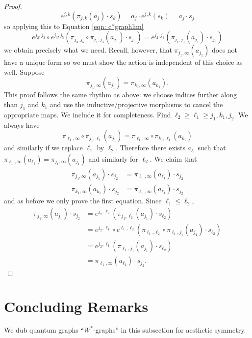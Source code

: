 \documentclass[12pt]{article}
\theoremstyle{definition}
\newcommand{\<}{\langle}
\renewcommand{\>}{\rangle}
\begin{document}
\begin{proof}
    \[
    e^{j,k} (\pi_{j,k}(a_j) \cdot s_k) = a_j \cdot e^{j,k}(s_k) = a_j \cdot s_j
    \]
    so applying this to Equation \ref{eqn: c*graphlim}
    \[
    e^{j_2,j_3} \circ e^{j_3, j_5} (\pi_{j_3, j_5} \circ \pi_{j_1, j_3} (a_{j_1}) \cdot s_{j_5}) = e^{j_2,j_3}(\pi_{j_1, j_3}(a_{j_1}) \cdot s_{j_3})
    \]
    we obtain precisely what we need. Recall, however, that $\pi_{j_1,\infty}(a_{j_1})$ does not have a unique form so we must show the action is independent of this choice as well. Suppose
    \[
    \pi_{j_1, \infty}(a_{j_1}) = \pi_{k_1,\infty}(a_{k_1}).
    \]
    This proof follows the same rhythm as above: we choose indices further along than $j_1$ and $k_1$ and use the inductive/projective morphisms to cancel the appropriate maps. We include it for completeness. Find $\ell_2 \geq \ell_1 \geq j_1, k_1, j_2$. We always have 
    \[
    \pi_{\ell_1,\infty} \circ \pi_{j_1,\ell_1} (a_{j_1}) = \pi_{\ell_1,\infty} \circ \pi_{k_1,\ell_1} (a_{k_1})
    \]
    and similarly if we replace $\ell_1$ by $\ell_2$. Therefore there exists $a_{\ell_1}$ such that $\pi_{\ell_1, \infty}(a_{\ell_1}) = \pi_{j_1, \infty}(a_{j_1})$ and similarly for $\ell_2$. We claim that 
    \begin{align*}
        \pi_{j_1, \infty}(a_{j_1}) \cdot s_{j_2} &= \pi_{\ell_1, \infty}(a_{\ell_1}) \cdot s_{j_2}     \\
        \pi_{k_1, \infty}(a_{k_1}) \cdot s_{j_2} &= \pi_{\ell_1, \infty}(a_{\ell_1}) \cdot s_{j_2}  
    \end{align*}
    and as before we only prove the first equation. Since $\ell_1 \leq \ell_2$,
    \begin{align*}
    \pi_{j_1, \infty}(a_{j_1}) \cdot s_{j_2} &= e^{j_2, \ell_2} (\pi_{j_1, \ell_2}(a_{j_1}) \cdot s_{\ell_2}) \\
    &= e^{j_2, \ell_1} \circ e^{\ell_1, \ell_2} (\pi_{\ell_1, \ell_2} \circ \pi_{\ell_1, j_1} (a_{j_1}) \cdot s_{\ell_2}) \\
    &= e^{j_2, \ell_1}(\pi_{\ell_1, j_1} (a_{j_1}) \cdot s_{\ell_2})\\
    &= \pi_{\ell_1, \infty}(a_{\ell_1}) \cdot s_{j_2} .
    \end{align*}
\end{proof}

\section{Concluding Remarks} \label{sec: remarks}
We dub quantum graphs ``$W^*$-graphs'' in this subsection for aesthetic symmetry.
\end{document}
